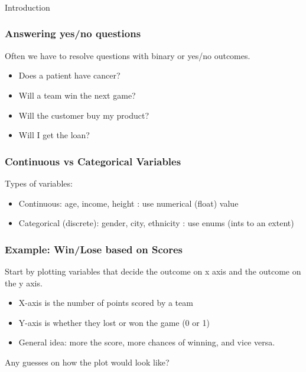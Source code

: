 \begin{frame}[fragile]\frametitle{}
\begin{center}
{\Large Introduction}
\end{center}
\end{frame}

\begin{frame}[fragile]\frametitle{Answering yes/no questions}
Often we have to resolve questions with binary or yes/no outcomes.
\begin{itemize}
\item Does a patient have cancer?
\item Will a team win the next game?
\item Will the customer buy my product?
\item Will I get the loan?
\end{itemize}
\end{frame}

\begin{frame}[fragile]\frametitle{Continuous vs Categorical Variables}

Types of variables:
\begin{itemize}
\item Continuous: age, income, height : use numerical (float) value
\item Categorical (discrete): gender, city, ethnicity : use  enums (ints to an extent)
\end{itemize}

\end{frame}

\begin{frame}[fragile]\frametitle{Example: Win/Lose based on Scores}
Start by plotting variables that decide the outcome on x axis and the outcome on the y axis.

\begin{itemize}
\item X-axis is the number of points scored by a team
\item Y-axis is whether they lost or won the game (0 or 1)
\item General idea: more the score, more chances of winning, and vice versa.
\end{itemize}

Any guesses on how the plot would look like?

\end{frame}

